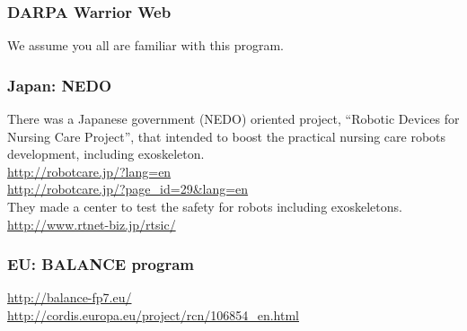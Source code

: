 \subsubsection{DARPA Warrior Web}

\noindent
We assume you all are familiar with this program.

\subsubsection{Japan: NEDO}

\noindent
There was a Japanese government (NEDO) oriented project, ``Robotic
Devices for Nursing Care Project'', that intended to boost the
practical nursing care robots development, including exoskeleton.\\
\url{http://robotcare.jp/?lang=en}\\
\url{http://robotcare.jp/?page_id=29&lang=en}\\
They made a center to test the safety for robots including exoskeletons.\\
\url{http://www.rtnet-biz.jp/rtsic/}\\

\subsubsection{EU: BALANCE program}

\noindent
\url{http://balance-fp7.eu/}\\
\url{http://cordis.europa.eu/project/rcn/106854_en.html}\\




